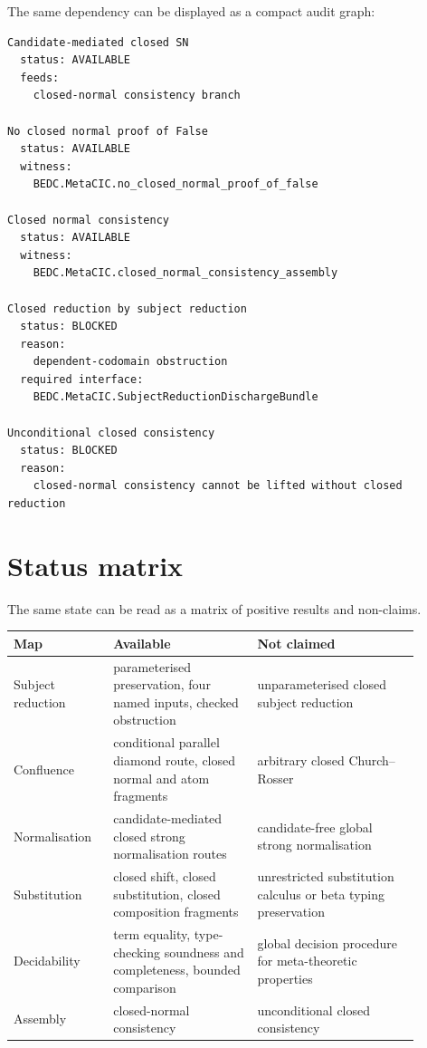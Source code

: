 The same dependency can be displayed as a compact audit graph:

\begin{verbatim}
Candidate-mediated closed SN
  status: AVAILABLE
  feeds:
    closed-normal consistency branch

No closed normal proof of False
  status: AVAILABLE
  witness:
    BEDC.MetaCIC.no_closed_normal_proof_of_false

Closed normal consistency
  status: AVAILABLE
  witness:
    BEDC.MetaCIC.closed_normal_consistency_assembly

Closed reduction by subject reduction
  status: BLOCKED
  reason:
    dependent-codomain obstruction
  required interface:
    BEDC.MetaCIC.SubjectReductionDischargeBundle

Unconditional closed consistency
  status: BLOCKED
  reason:
    closed-normal consistency cannot be lifted without closed reduction
\end{verbatim}

\section{Status matrix}
\label{sec:metacic-audit-synthesis-status-matrix}

The same state can be read as a matrix of positive results and non-claims.

\begin{center}
\begin{tabular}{p{0.21\linewidth}p{0.32\linewidth}p{0.36\linewidth}}
\textbf{Map} & \textbf{Available} & \textbf{Not claimed} \\
\hline
Subject reduction &
parameterised preservation, four named inputs, checked obstruction &
unparameterised closed subject reduction \\
Confluence &
conditional parallel diamond route, closed normal and atom fragments &
arbitrary closed Church--Rosser \\
Normalisation &
candidate-mediated closed strong normalisation routes &
candidate-free global strong normalisation \\
Substitution &
closed shift, closed substitution, closed composition fragments &
unrestricted substitution calculus or beta typing preservation \\
Decidability &
term equality, type-checking soundness and completeness, bounded comparison &
global decision procedure for meta-theoretic properties \\
Assembly &
closed-normal consistency &
unconditional closed consistency \\
\end{tabular}
\end{center}

